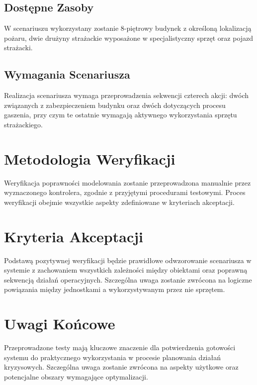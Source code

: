 \subsection{Dostępne Zasoby}
W scenariuszu wykorzystany zostanie 8-piętrowy budynek z określoną lokalizacją pożaru, dwie drużyny strażackie wyposażone w specjalistyczny sprzęt oraz pojazd strażacki.

\subsection{Wymagania Scenariusza}
Realizacja scenariusza wymaga przeprowadzenia sekwencji czterech akcji: dwóch związanych z zabezpieczeniem budynku oraz dwóch dotyczących procesu gaszenia, przy czym te ostatnie wymagają aktywnego wykorzystania sprzętu strażackiego.
\section{Metodologia Weryfikacji}
Weryfikacja poprawności modelowania zostanie przeprowadzona manualnie przez wyznaczonego kontrolera, zgodnie z przyjętymi procedurami testowymi. Proces weryfikacji obejmie wszystkie aspekty zdefiniowane w kryteriach akceptacji.
\section{Kryteria Akceptacji}
Podstawą pozytywnej weryfikacji będzie prawidłowe odwzorowanie scenariusza w systemie z zachowaniem wszystkich zależności między obiektami oraz poprawną sekwencją działań operacyjnych. Szczególna uwaga zostanie zwrócona na logiczne powiązania między jednostkami a wykorzystywanym przez nie sprzętem.
\section{Uwagi Końcowe}
Przeprowadzone testy mają kluczowe znaczenie dla potwierdzenia gotowości systemu do praktycznego wykorzystania w procesie planowania działań kryzysowych. Szczególna uwaga zostanie zwrócona na aspekty użytkowe oraz potencjalne obszary wymagające optymalizacji.

